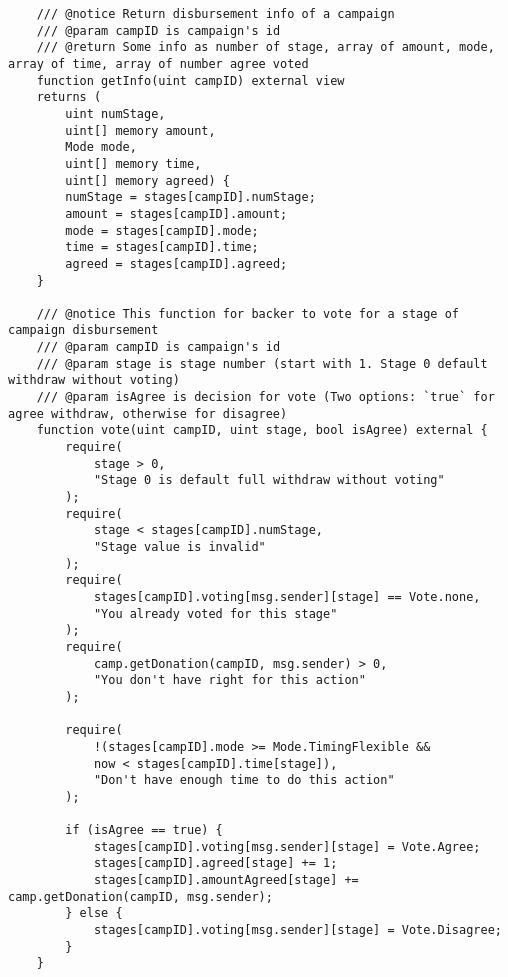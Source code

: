 \documentclass[../main-report.tex]{subfiles}
\begin{document}
\begin{lstlisting}
    /// @notice Return disbursement info of a campaign
    /// @param campID is campaign's id
    /// @return Some info as number of stage, array of amount, mode, array of time, array of number agree voted
    function getInfo(uint campID) external view
    returns (
        uint numStage,
        uint[] memory amount,
        Mode mode,
        uint[] memory time,
        uint[] memory agreed) {
        numStage = stages[campID].numStage;
        amount = stages[campID].amount;
        mode = stages[campID].mode;
        time = stages[campID].time;
        agreed = stages[campID].agreed;
    }

    /// @notice This function for backer to vote for a stage of campaign disbursement
    /// @param campID is campaign's id
    /// @param stage is stage number (start with 1. Stage 0 default withdraw without voting)
    /// @param isAgree is decision for vote (Two options: `true` for agree withdraw, otherwise for disagree)
    function vote(uint campID, uint stage, bool isAgree) external {
        require(
            stage > 0,
            "Stage 0 is default full withdraw without voting"
        );
        require(
            stage < stages[campID].numStage,
            "Stage value is invalid"
        );
        require(
            stages[campID].voting[msg.sender][stage] == Vote.none,
            "You already voted for this stage"
        );
        require(
            camp.getDonation(campID, msg.sender) > 0,
            "You don't have right for this action"
        );

        require(
            !(stages[campID].mode >= Mode.TimingFlexible &&
            now < stages[campID].time[stage]),
            "Don't have enough time to do this action"
        );

        if (isAgree == true) {
            stages[campID].voting[msg.sender][stage] = Vote.Agree;
            stages[campID].agreed[stage] += 1;
            stages[campID].amountAgreed[stage] += camp.getDonation(campID, msg.sender);
        } else {
            stages[campID].voting[msg.sender][stage] = Vote.Disagree;
        }
    }


\end{lstlisting}
\end{document}
